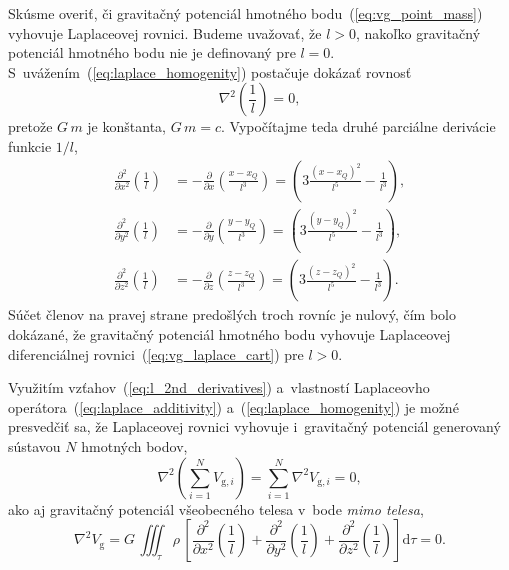 \documentclass[a4paper,12pt]{book}
\newcommand{\diff}{\mathrm d}
\newcommand{\gidx}{\mathrm g}
\begin{document}
Skúsme overiť, či gravitačný potenciál hmotného bodu~(\ref{eq:vg_point_mass})
vyhovuje Laplaceovej rovnici.  Budeme uvažovať, že $l > 0$, nakoľko gravitačný
potenciál hmotného bodu nie je definovaný pre $l = 0$.
S~uvážením~(\ref{eq:laplace_homogenity}) postačuje dokázať rovnosť
%
\begin{equation}
\label{eq:nabla_l}
\nabla^2 \left( \frac{1}{l} \right) = 0{,}
\end{equation}
%
pretože $G \, m$ je konštanta, $G \, m = c$.  Vypočítajme teda druhé parciálne
derivácie funkcie $1 \slash l$,
%
\begin{equation}
\label{eq:l_2nd_derivatives}
\begin{split}
\frac{\partial^2}{\partial x^2} \left( \frac{1}{l} \right) &=
-\frac{\partial}{\partial x} \left( \frac{x - x_Q}{l^3} \right) = \left(3
\frac{(x - x_Q)^2}{l^5} - \frac{1}{l^3} \right){,}\\
%
\frac{\partial^2}{\partial y^2} \left( \frac{1}{l} \right) &=
-\frac{\partial}{\partial y} \left( \frac{y - y_Q}{l^3} \right) = \left(3
\frac{(y - y_Q)^2}{l^5} - \frac{1}{l^3} \right){,}\\
%
\frac{\partial^2}{\partial z^2} \left( \frac{1}{l} \right) &=
-\frac{\partial}{\partial z} \left( \frac{z - z_Q}{l^3} \right) = \left(3
\frac{(z - z_Q)^2}{l^5} - \frac{1}{l^3} \right){.}
\end{split}
\end{equation}
%
Súčet členov na pravej strane predošlých troch rovníc je nulový, čím bolo
dokázané, že gravitačný potenciál hmotného bodu vyhovuje Laplaceovej
diferenciálnej rovnici~(\ref{eq:vg_laplace_cart}) pre $l > 0$.

Využitím vzťahov~(\ref{eq:l_2nd_derivatives}) a~vlastností Laplaceovho
operátora~(\ref{eq:laplace_additivity}) a~(\ref{eq:laplace_homogenity}) je
možné presvedčiť sa, že Laplaceovej rovnici vyhovuje i~gravitačný potenciál
generovaný sústavou $N$ hmotných bodov,
%
\begin{equation}
\nabla^2 \left( \sum_{i = 1}^N V_{\gidx,i} \right) = \sum_{i = 1}^N \nabla^2
V_{\gidx,i} = 0{,}
\end{equation}
%
ako aj gravitačný potenciál všeobecného telesa v~bode \emph{mimo telesa},
%
\begin{equation}
\nabla^2 V_\gidx = G\, \iiint_\tau \rho \, \left[ \frac{\partial^2}{\partial
x^2}\left(\frac{1}{l}\right) + \frac{\partial^2}{\partial
y^2}\left(\frac{1}{l}\right) + \frac{\partial^2}{\partial
z^2}\left(\frac{1}{l}\right) \right] \diff\tau = 0{.}
\end{equation}
\end{document}
